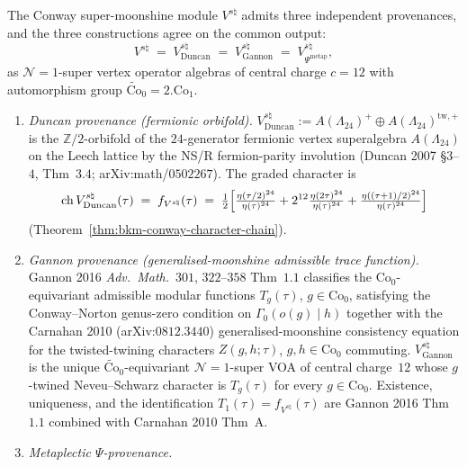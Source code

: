 \begin{theorem}
\label{thm:bkm-conway-three-provenances}
The Conway super-moonshine module $V^{s\natural}$ admits three
independent provenances, and the three constructions agree on
the common output:
\[
 V^{s\natural}
 \;=\;
 V^{s\natural}_{\mathrm{Duncan}}
 \;=\;
 V^{s\natural}_{\mathrm{Gannon}}
 \;=\;
 V^{s\natural}_{\Psi^{\mathrm{metap}}},
\]
as $\mathcal{N}{=}1$-super vertex operator algebras of central
charge $c = 12$ with automorphism group
$\widetilde{\mathrm{Co}}_0 = 2.\mathrm{Co}_1$.
\begin{enumerate}[label=\textup{(P\arabic*)}]
\item \emph{Duncan provenance (fermionic orbifold).}
$V^{s\natural}_{\mathrm{Duncan}}
:= A(\Lambda_{24})^{+}\oplus A(\Lambda_{24})^{\mathrm{tw},+}$
is the $\mathbb{Z}/2$-orbifold of the $24$-generator fermionic
vertex superalgebra $A(\Lambda_{24})$ on the Leech lattice by the
NS/R fermion-parity involution
(Duncan 2007 \S$3$--$4$, Thm~$3.4$; arXiv:math/$0502267$).
The graded character is
\[
 \mathrm{ch}\,V^{s\natural}_{\mathrm{Duncan}}(\tau)
 \;=\;
 f_{V^{s\natural}}(\tau)
 \;=\;
 \tfrac{1}{2}\Bigl[
 \tfrac{\eta(\tau/2)^{24}}{\eta(\tau)^{24}}
 + 2^{12}\tfrac{\eta(2\tau)^{24}}{\eta(\tau)^{24}}
 + \tfrac{\eta((\tau{+}1)/2)^{24}}{\eta(\tau)^{24}}
 \Bigr]
\]
\textup{(}Theorem~\ref{thm:bkm-conway-character-chain}\textup{)}.
\item \emph{Gannon provenance (generalised-moonshine admissible
trace function).} Gannon 2016 \emph{Adv.\ Math.}~$301$,
$322$--$358$ \cite{Gannon16} Thm~$1.1$ classifies the
$\mathrm{Co}_0$-equivariant admissible modular functions
$T_g(\tau)$, $g\in\mathrm{Co}_0$, satisfying the Conway--Norton
genus-zero condition on $\Gamma_0(o(g)\mid h)$ together with the
Carnahan 2010 (arXiv:$0812.3440$) generalised-moonshine consistency
equation for the twisted-twining characters
$Z(g, h; \tau)$, $g, h\in\mathrm{Co}_0$ commuting.
$V^{s\natural}_{\mathrm{Gannon}}$ is the unique
$\widetilde{\mathrm{Co}}_0$-equivariant $\mathcal{N}{=}1$-super VOA
of central charge~$12$ whose $g$-twined Neveu--Schwarz character
is $T_g(\tau)$ for every $g\in\mathrm{Co}_0$. Existence, uniqueness,
and the identification $T_1(\tau) = f_{V^{s\natural}}(\tau)$ are
Gannon 2016 Thm~$1.1$ combined with Carnahan 2010 Thm~A.
\item \emph{Metaplectic $\Psi$-provenance.}

\end{enumerate}
\end{theorem}
